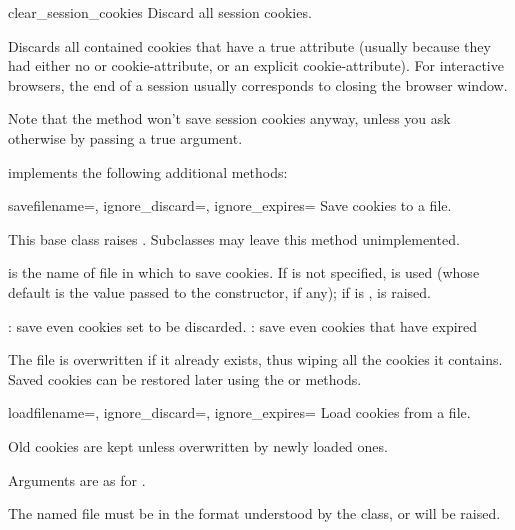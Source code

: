 \begin{methoddesc}[CookieJar]{clear_session_cookies}{}
Discard all session cookies.

Discards all contained cookies that have a true 
attribute (usually because they had either no  or
 cookie-attribute, or an explicit 
cookie-attribute).  For interactive browsers, the end of a session
usually corresponds to closing the browser window.

Note that the  method won't save session cookies
anyway, unless you ask otherwise by passing a true
 argument.
\end{methoddesc}

 implements the following additional methods:

\begin{methoddesc}[FileCookieJar]{save}{filename=,
    ignore_discard=, ignore_expires=}
Save cookies to a file.

This base class raises .  Subclasses may
leave this method unimplemented.

 is the name of file in which to save cookies.  If
 is not specified,  is used (whose
default is the value passed to the constructor, if any); if
 is ,  is
raised.

: save even cookies set to be discarded.
: save even cookies that have expired

The file is overwritten if it already exists, thus wiping all the
cookies it contains.  Saved cookies can be restored later using the
 or  methods.
\end{methoddesc}

\begin{methoddesc}[FileCookieJar]{load}{filename=,
    ignore_discard=, ignore_expires=}
Load cookies from a file.

Old cookies are kept unless overwritten by newly loaded ones.

Arguments are as for .

The named file must be in the format understood by the class, or
 will be raised.
\end{methoddesc}

